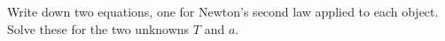 Write down two equations, one for Newton's
        second law applied to each object. Solve these for the two
        unknowns $T$ and $a$.
